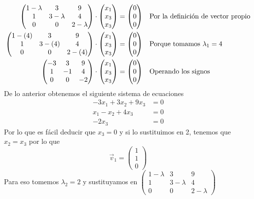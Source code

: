 \documentclass[letterpaper]{article}
\renewcommand{\*}{\cdot}
\theoremstyle{definition}
\begin{document}
\begin{align*}
	\begin{pmatrix}
	1- \lambda & 3 & 9\\
	1 & 3 -\lambda & 4\\
	0 & 0 & 2- \lambda 
	\end{pmatrix} \* \begin{pmatrix}
	x_1\\
	x_3\\
	x_3
	\end{pmatrix} &= \begin{pmatrix}
	0\\
	0\\
	0
	\end{pmatrix} && \text{Por la definición de vector propio}\\ 
	\begin{pmatrix}
	1- (4) & 3 & 9\\
	1 & 3 -(4) & 4\\
	0 & 0 & 2- (4) 
	\end{pmatrix} \* \begin{pmatrix}
	x_1\\
	x_3\\
	x_3
	\end{pmatrix} &= \begin{pmatrix}
	0\\
	0\\
	0
	\end{pmatrix} && \text{Porque tomamos $ \lambda_1 = 4 $}\\
	\begin{pmatrix}
	-3 & 3 & 9\\
	1 & -1 & 4\\
	0 & 0 & - 2 
	\end{pmatrix} \* \begin{pmatrix}
	x_1\\
	x_3\\
	x_3
	\end{pmatrix} &= \begin{pmatrix}
	0\\
	0\\
	0
	\end{pmatrix} && \text{Operando los signos}\\
\end{align*}
De lo anterior obtenemos el siguiente sistema de ecuaciones
\begin{align}
	-3x_1 + 3x_2 + 9x_3 &= 0\\
	x_1 -x_2 +4x_3 &= 0\\
	-2x_3 &= 0
\end{align}
Por lo que es fácil deducir que $ x_3 = 0 $ y si lo sustituimos en 2, tenemos que $ x_2 = x_3 $
por lo que \[ \vec{v}_1 = \begin{pmatrix}
1\\
1\\
0
\end{pmatrix} \]
Para eso tomemos $ \lambda_2 = 2 $ y sustituyamos en $ \begin{pmatrix}
1- \lambda & 3 & 9\\
1 & 3 -\lambda & 4\\
0 & 0 & 2- \lambda 
\end{pmatrix} $
\end{document}
